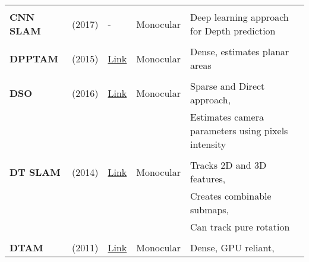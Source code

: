 {\begin{longtable}{l|l|l|l|l}
			&                                   &                                                                    &                       &\\
			\textbf{CNN SLAM}      & \cite{Tateno2017} (2017)          & -                                                                  & Monocular             & Deep learning approach for Depth prediction\\
			&                                   &                                                                    &                       &\\
			\textbf{DPPTAM}        & \cite{Concha2015b} (2015)         & {\href{https://github.com/alejocb/dpptam}{Link}}                   & Monocular             & Dense, estimates planar areas\\
			&                                   &                                                                    &                       &\\
			\textbf{DSO}           & \cite{Engel-et-al-pami2018} (2016)           & {\href{https://github.com/JakobEngel/dso}{Link}}                   & Monocular             & Sparse and Direct approach,\\
			&                                   &                                                                    &                       & Estimates camera parameters using pixels intensity\\
			&                                   &                                                                    &                       &\\
			\textbf{DT SLAM}       & \cite{Daniel2014} (2014)          & {\href{https://github.com/plumonito/dtslam}{Link}}                 & Monocular             & Tracks 2D and 3D features,\\
			&                                   &                                                                    &                       & Creates combinable submaps,\\
			&                                   &                                                                    &                       & Can track pure rotation\\
			&                                   &                                                                    &                       &\\
			\textbf{DTAM}          & \cite{Newcombe2011} (2011)        & {\href{https://github.com/anuranbaka/OpenDTAM}{Link}}              & Monocular             & Dense, GPU reliant,\\

\end{longtable}}
